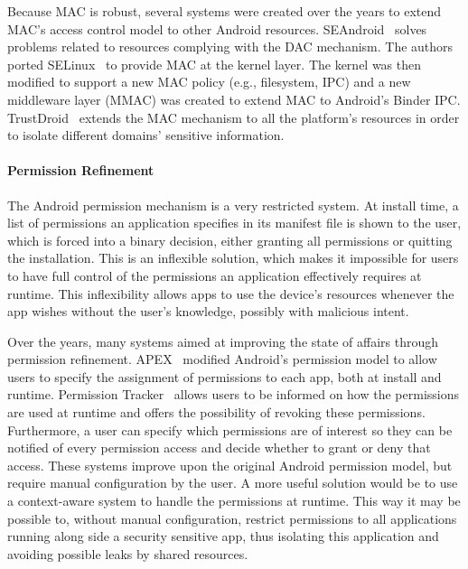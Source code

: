 Because \ac{MAC} is robust, several systems were created over the years to extend \ac{MAC}'s access control model to other Android resources. SEAndroid~\cite{smalley2013security} solves problems related to resources complying with the \ac{DAC} mechanism. The authors ported SELinux~\cite{peter2001integrating} to provide \ac{MAC} at the kernel layer. The kernel was then modified to support a new \ac{MAC} policy (e.g., filesystem, IPC) and a new middleware layer (MMAC) was created to extend \ac{MAC} to Android's Binder IPC. TrustDroid~\cite{bugiel2011practical} extends the \ac{MAC} mechanism to all the platform's resources in order to isolate different domains' sensitive information.

\paragraph{\textbf{Permission Refinement}} %

The Android permission mechanism is a very restricted system. At install time, a list of permissions an application specifies in its manifest file is shown to the user, which is forced into a binary decision, either granting all permissions or quitting the installation. This is an inflexible solution, which makes it impossible for users to have full control of the permissions an application effectively requires at runtime. This inflexibility allows apps to use the device's resources whenever the app wishes without the user's knowledge, possibly with malicious intent.

Over the years, many systems aimed at improving the state of affairs through permission refinement. APEX~\cite{nauman2010apex} modified Android's permission model to allow users to specify the assignment of permissions to each app, both at install and runtime. Permission Tracker~\cite{kern2012permission} allows users to be informed on how the permissions are used at runtime and offers the possibility of revoking these permissions. Furthermore, a user can specify which permissions are of interest so they can be notified of every permission access and decide whether to grant or deny that access. These systems improve upon the original Android permission model, but require manual configuration by the user. %
A more useful solution would be to use a context-aware system to handle the permissions at runtime. This way it may be possible to, without manual configuration, restrict permissions to all applications running along side a security sensitive app, thus isolating this application and avoiding possible leaks by shared resources.

